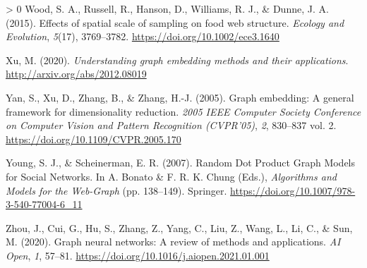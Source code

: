 \documentclass[11pt]{article}
\newlength{\cslhangindent}
\newenvironment{CSLReferences}[3] %
 {%
  \setlength{\parindent}{0pt}
  \ifodd #1 \everypar{\setlength{\hangindent}{\cslhangindent}}\ignorespaces\fi
  \ifnum #2 > 0
  \setlength{\parskip}{#2\baselineskip}
  \fi
 }%
 {}
\begin{document}
\begin{CSLReferences}{1}{0}
\leavevmode\hypertarget{ref-Wood2015EffSpa}{}%
Wood, S. A., Russell, R., Hanson, D., Williams, R. J., \& Dunne, J. A.
(2015). Effects of spatial scale of sampling on food web structure.
\emph{Ecology and Evolution}, \emph{5}(17), 3769--3782.
\url{https://doi.org/10.1002/ece3.1640}

\leavevmode\hypertarget{ref-Xu2020UndGra}{}%
Xu, M. (2020). \emph{Understanding graph embedding methods and their
applications}. \url{http://arxiv.org/abs/2012.08019}

\leavevmode\hypertarget{ref-Yan2005GraEmb}{}%
Yan, S., Xu, D., Zhang, B., \& Zhang, H.-J. (2005). Graph embedding: A
general framework for dimensionality reduction. \emph{2005 IEEE Computer
Society Conference on Computer Vision and Pattern Recognition
(CVPR'05)}, \emph{2}, 830--837 vol. 2.
\url{https://doi.org/10.1109/CVPR.2005.170}

\leavevmode\hypertarget{ref-Young2007RanDot}{}%
Young, S. J., \& Scheinerman, E. R. (2007). Random Dot Product Graph
Models for Social Networks. In A. Bonato \& F. R. K. Chung (Eds.),
\emph{Algorithms and Models for the Web-Graph} (pp. 138--149). Springer.
\url{https://doi.org/10.1007/978-3-540-77004-6_11}

\leavevmode\hypertarget{ref-Zhou2020GraNeu}{}%
Zhou, J., Cui, G., Hu, S., Zhang, Z., Yang, C., Liu, Z., Wang, L., Li,
C., \& Sun, M. (2020). Graph neural networks: A review of methods and
applications. \emph{AI Open}, \emph{1}, 57--81.
\url{https://doi.org/10.1016/j.aiopen.2021.01.001}

\end{CSLReferences}
\end{document}
